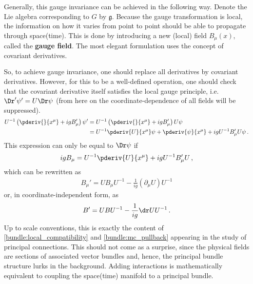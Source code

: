     Generally, this gauge invariance can be achieved in the following way. Denote the Lie algebra corresponding to $G$ by $\mathfrak{g}$. Because the gauge transformation is local, the information on how it varies from point to point should be able to propagate through space(time). This is done by introducing a new (local) field $B_\mu(x)$, called the \textbf{gauge field}. The most elegant formulation uses the concept of covariant derivatives.

    So, to achieve gauge invariance, one should replace all derivatives by covariant derivatives. However, for this to be a well-defined operation, one should check that the covariant derivative itself satisfies the local gauge principle, i.e.~$\Dr'\psi'=U\Dr\psi$ (from here on the coordinate-dependence of all fields will be suppressed).
    \begin{align}
        U^{-1}\left(\pderiv{}{x^\mu} + igB_\mu'\right)\psi' &= U^{-1}\left(\pderiv{}{x^\mu} + igB_\mu'\right)U\psi\nonumber\\
        &= U^{-1}\pderiv{U}{x^\mu}\psi + \pderiv{\psi}{x^\mu} + igU^{-1}B_\mu'U\psi\,.
    \end{align}
    This expression can only be equal to $\Dr\psi$ if
    \begin{gather}
        igB_\mu = U^{-1}\pderiv{U}{x^\mu} + igU^{-1}B_\mu'U\,,
    \end{gather}
    which can be rewritten as
    \begin{gather}
        B_\mu' = UB_\mu U^{-1} - \frac{1}{ig}(\partial_\mu U)U^{-1}
    \end{gather}
    or, in coordinate-independent form, as
    \begin{gather}
        B' = UBU^{-1} - \frac{1}{ig}\dr UU^{-1}\,.
    \end{gather}
    Up to scale conventions, this is exactly the content of \cref{bundle:local_compatibility} and \cref{bundle:mc_pullback} appearing in the study of principal connections. This should not come as a surprise, since the physical fields are sections of associated vector bundles and, hence, the principal bundle structure lurks in the background. Adding interactions is mathematically equivalent to coupling the space(time) manifold to a principal bundle.

